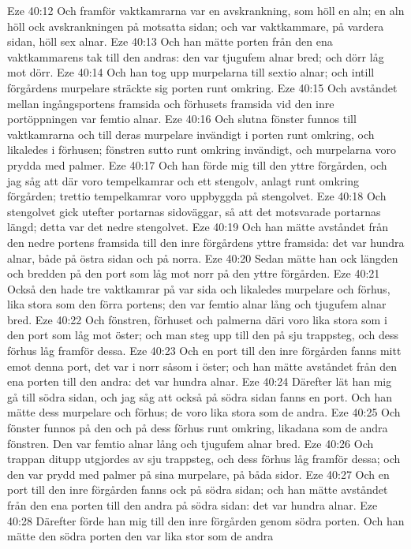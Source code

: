Eze 40:12  Och framför vaktkamrarna var en avskrankning, som höll en aln; en aln höll ock avskrankningen på motsatta sidan; och var vaktkammare, på vardera sidan, höll sex alnar.
Eze 40:13  Och han mätte porten från den ena vaktkammarens tak till den andras: den var tjugufem alnar bred; och dörr låg mot dörr.
Eze 40:14  Och han tog upp murpelarna till sextio alnar; och intill förgårdens murpelare sträckte sig porten runt omkring.
Eze 40:15  Och avståndet mellan ingångsportens framsida och förhusets framsida vid den inre portöppningen var femtio alnar.
Eze 40:16  Och slutna fönster funnos till vaktkamrarna och till deras murpelare invändigt i porten runt omkring, och likaledes i förhusen; fönstren sutto runt omkring invändigt, och murpelarna voro prydda med palmer.
Eze 40:17  Och han förde mig till den yttre förgården, och jag såg att där voro tempelkamrar och ett stengolv, anlagt runt omkring förgården; trettio tempelkamrar voro uppbyggda på stengolvet.
Eze 40:18  Och stengolvet gick utefter portarnas sidoväggar, så att det motsvarade portarnas längd; detta var det nedre stengolvet.
Eze 40:19  Och han mätte avståndet från den nedre portens framsida till den inre förgårdens yttre framsida: det var hundra alnar, både på östra sidan och på norra.
Eze 40:20  Sedan mätte han ock längden och bredden på den port som låg mot norr på den yttre förgården.
Eze 40:21  Också den hade tre vaktkamrar på var sida och likaledes murpelare och förhus, lika stora som den förra portens; den var femtio alnar lång och tjugufem alnar bred.
Eze 40:22  Och fönstren, förhuset och palmerna däri voro lika stora som i den port som låg mot öster; och man steg upp till den på sju trappsteg, och dess förhus låg framför dessa.
Eze 40:23  Och en port till den inre förgården fanns mitt emot denna port, det var i norr såsom i öster; och han mätte avståndet från den ena porten till den andra: det var hundra alnar.
Eze 40:24  Därefter lät han mig gå till södra sidan, och jag såg att också på södra sidan fanns en port. Och han mätte dess murpelare och förhus; de voro lika stora som de andra.
Eze 40:25  Och fönster funnos på den och på dess förhus runt omkring, likadana som de andra fönstren. Den var femtio alnar lång och tjugufem alnar bred.
Eze 40:26  Och trappan ditupp utgjordes av sju trappsteg, och dess förhus låg framför dessa; och den var prydd med palmer på sina murpelare, på båda sidor.
Eze 40:27  Och en port till den inre förgården fanns ock på södra sidan; och han mätte avståndet från den ena porten till den andra på södra sidan: det var hundra alnar.
Eze 40:28  Därefter förde han mig till den inre förgården genom södra porten. Och han mätte den södra porten den var lika stor som de andra
